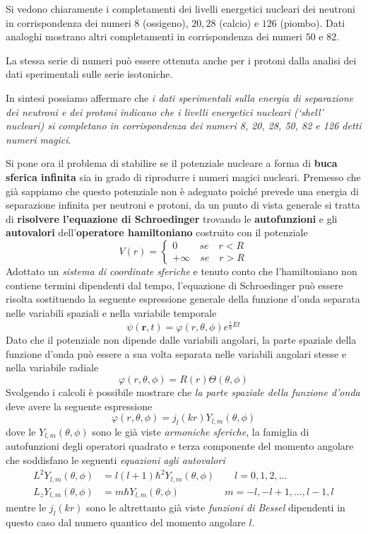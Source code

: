 Si vedono chiaramente i completamenti dei livelli energetici nucleari dei neutroni in corrispondenza dei numeri $8$
(ossigeno), $20, 28$ (calcio) e $126$ (piombo).
Dati analoghi mostrano altri completamenti in corrispondenza dei numeri $50$ e $82$.

La stessa serie di numeri può essere ottenuta anche per i protoni dalla analisi dei dati sperimentali sulle serie isotoniche.

In sintesi possiamo affermare che
\emph{i dati sperimentali sulla energia di separazione dei neutroni e dei protoni indicano che i  livelli energetici nucleari (‘shell’ nucleari)
	si completano in corrispondenza dei numeri 8, 20, 28, 50, 82 e 126 detti numeri magici}.
\bigskip

Si pone ora il problema di stabilire se il potenziale nucleare a forma di \textbf{buca sferica infinita} sia in grado di riprodurre i numeri magici nucleari. Premesso che già sappiamo che questo potenziale non è adeguato poiché prevede una energia di separazione infinita per neutroni e protoni, da un punto di vista generale si tratta di \textbf{risolvere l’equazione di Schroedinger} trovando le \textbf{autofunzioni} e gli \textbf{autovalori} dell’\textbf{operatore hamiltoniano} costruito con il potenziale
\[
V(r) =
\begin{cases}
	0 \qquad \ se \quad r <R \\
	+ \infty \quad se \quad r > R
\end{cases}
\]
Adottato un \emph{sistema di coordinate sferiche} e tenuto conto che l’hamiltoniano non contiene termini dipendenti dal tempo, l’equazione di Schroedinger può essere risolta sostituendo la seguente espressione generale della funzione d’onda separata nelle variabili spaziali e nella variabile temporale
\[
\psi(\mathbf{r},t) = \varphi(r, \theta, \phi) e^{ \frac{i}{\hbar} Et}
\]
Dato che il potenziale non dipende dalle variabili angolari, la parte spaziale della funzione d’onda può essere a sua volta separata nelle variabili angolari stesse e nella variabile radiale
\[
\varphi(r, \theta, \phi) = R(r) \Theta(\theta, \phi)
\]
Svolgendo i calcoli è possibile mostrare che \emph{la parte spaziale della funzione d’onda} deve avere la seguente espressione
\[
\varphi (r, \theta, \phi) = j_{l} (kr) Y_{l,m}(\theta,\phi)
\]
dove le $Y_{l,m}(\theta,\phi)$ sono le già viste \emph{armoniche sferiche}, la famiglia di autofunzioni degli operatori quadrato e terza componente del momento angolare che soddisfano le seguenti \emph{equazioni agli autovalori}
\begin{align*}
	L^{2} Y_{l,m} (\theta, \phi) &= l(l+1) \hbar^{2} Y_{l,m}(\theta,\phi) \qquad l = 0,1,2,\dots \\
	L_{z}Y_{l,m}(\theta, \phi) &= m \hbar Y_{l,m}(\theta,\phi) \qquad
	\qquad \ \ \,
	m = -l,-l+1, \dots, l-1,l
\end{align*}
mentre le $j_{l}(kr)$ sono le altrettanto già viste \emph{funzioni di Bessel} dipendenti in questo caso dal numero quantico del momento angolare $l$.

